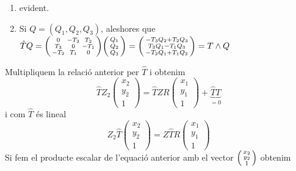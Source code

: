 \documentclass[a4paper,12pt]{article}
\begin{document}
	\begin{demostracio}
		\begin{enumerate}
			\item evident.
			\item Si $Q = (Q_1, Q_2, Q_3)$, aleshores que $\hat{T}Q = \begin{psmallmatrix}0 & -T_3 & T_2\\
			T_3 & 0 & -T_1\\
			-T_2 & T_1 & 0\end{psmallmatrix}\begin{psmallmatrix}Q_1\\Q_2\\Q_3\end{psmallmatrix} = \begin{psmallmatrix}-T_3Q_2 + T_2Q_3\\T_3Q_1 - T_1Q_3\\-T_2Q_1 + T_1Q_2\end{psmallmatrix} = T \wedge Q$
		\end{enumerate}
	\end{demostracio}
	Multipliquem la relació anterior per $\hat{T}$ i obtenim
	\begin{displaymath}
		\hat{T}Z_2 \begin{pmatrix}
			x_2\\y_2\\1
		\end{pmatrix}
		=
		\hat{T}ZR \begin{pmatrix}
			x_1\\y_1\\1
		\end{pmatrix}
		+ \underbrace{\hat{T} T}_{= 0}
	\end{displaymath}
	i com $\hat{T}$ és lineal
	\begin{displaymath}
		Z_2\hat{T}\begin{pmatrix}
			x_2\\y_2\\1
		\end{pmatrix}
		=
		Z\hat{T}R\begin{pmatrix}
			x_1\\y_1\\1
		\end{pmatrix}
	\end{displaymath}
	Si fem el producte escalar de l'equació anterior amb el vector $\begin{psmallmatrix}x_2\\y_2\\1\end{psmallmatrix}$ obtenim
\end{document}
